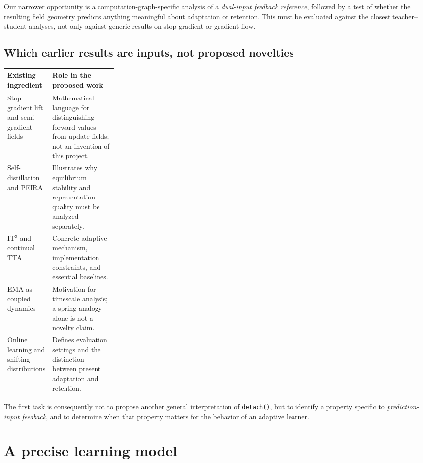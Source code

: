 \documentclass[11pt,a4paper]{article}
\begin{document}
Our narrower opportunity is a computation-graph-specific analysis of a \emph{dual-input feedback reference}, followed by a test of whether the resulting field geometry predicts anything meaningful about adaptation or retention. This must be evaluated against the closest teacher--student analyses, not only against generic results on stop-gradient or gradient flow.

\subsection{Which earlier results are inputs, not proposed novelties}
\begin{center}
\small
\begin{tabularx}{\linewidth}{@{}p{0.26\linewidth}X@{}}
\toprule
\textbf{Existing ingredient} & \textbf{Role in the proposed work} \\
\midrule
Stop-gradient lift and semi-gradient fields \cite{shen2026,games2019} & Mathematical language for distinguishing forward values from update fields; not an invention of this project. \\
Self-distillation and PEIRA \cite{peira2026} & Illustrates why equilibrium stability and representation quality must be analyzed separately. \\
IT$^3$ and continual TTA \cite{it3,cotta2022,rmt2023,petta2024} & Concrete adaptive mechanism, implementation constraints, and essential baselines. \\
EMA as coupled dynamics \cite{belay2023} & Motivation for timescale analysis; a spring analogy alone is not a novelty claim. \\
Online learning and shifting distributions \cite{oclreview2025,clposition2026} & Defines evaluation settings and the distinction between present adaptation and retention. \\
\bottomrule
\end{tabularx}
\end{center}

The first task is consequently not to propose another general interpretation of \texttt{detach()}, but to identify a property specific to \emph{prediction-input feedback}, and to determine when that property matters for the behavior of an adaptive learner.

\newpage
\section{A precise learning model}
\label{sec:model}
\end{document}
